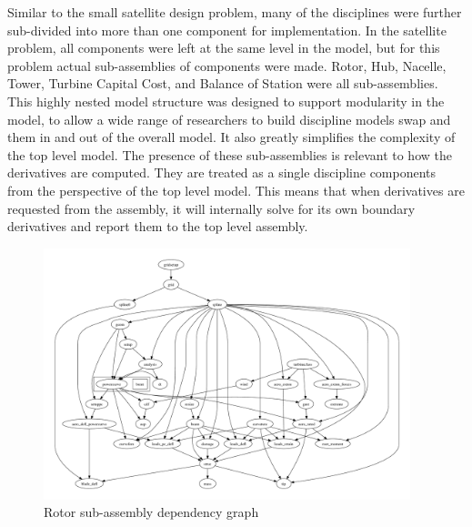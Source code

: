 \documentclass[]{aiaa-tc} %
\begin{document}
    Similar to the small satellite design problem, many of the disciplines were further
    sub-divided into more than one component for implementation. In the
    satellite problem, all components were left at the same level in the model, but for this problem 
    actual sub-assemblies of components were made. Rotor, Hub, Nacelle, Tower, Turbine Capital Cost, 
    and Balance of Station were all sub-assemblies. 
    This highly nested model structure was designed to support modularity in the model, 
    to allow a wide range of researchers to build discipline models swap and them in and out 
    of the overall model. It also greatly simplifies the complexity of the top level model. 
    The presence of these sub-assemblies is relevant to how the derivatives are computed. 
    They are treated as a single discipline components from the perspective of the top level model. 
    This means that when derivatives are requested from the assembly, it will internally solve 
    for its own boundary derivatives and report them to the top level assembly. 


    \begin{figure}[!htbp]
        \centering
        \includegraphics[width=0.95\textwidth]{images/rotor_depgraph}
        \caption{Rotor sub-assembly dependency graph}
        \label{fig:wt_sub_depgraph}
    \end{figure}
\end{document}

